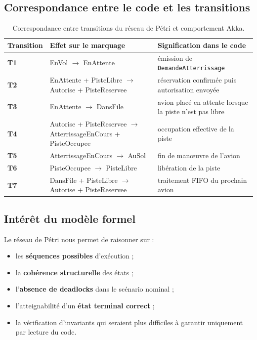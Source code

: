 \documentclass[11pt,a4paper]{article}
\begin{document}
\subsection{Correspondance entre le code et les transitions}

\begin{table}[H]
\centering
\caption{Correspondance entre transitions du réseau de Pétri et comportement Akka.}
\begin{tabularx}{\textwidth}{>{\bfseries}p{2.2cm} p{4.2cm} Y}
\toprule
Transition & Effet sur le marquage & Signification dans le code \\
\midrule
T1 & EnVol $\rightarrow$ EnAttente & émission de \texttt{DemandeAtterrissage} \\
T2 & EnAttente + PisteLibre $\rightarrow$ Autorise + PisteReservee & réservation confirmée puis autorisation envoyée \\
T3 & EnAttente $\rightarrow$ DansFile & avion placé en attente lorsque la piste n'est pas libre \\
T4 & Autorise + PisteReservee $\rightarrow$ AtterrissageEnCours + PisteOccupee & occupation effective de la piste \\
T5 & AtterrissageEnCours $\rightarrow$ AuSol & fin de manœuvre de l'avion \\
T6 & PisteOccupee $\rightarrow$ PisteLibre & libération de la piste \\
T7 & DansFile + PisteLibre $\rightarrow$ Autorise + PisteReservee & traitement FIFO du prochain avion \\
\bottomrule
\end{tabularx}
\end{table}

\subsection{Intérêt du modèle formel}

Le réseau de Pétri nous permet de raisonner sur :
\begin{itemize}
    \item les \textbf{séquences possibles} d'exécution ;
    \item la \textbf{cohérence structurelle} des états ;
    \item l'\textbf{absence de deadlocks} dans le scénario nominal ;
    \item l'atteignabilité d'un \textbf{état terminal correct} ;
    \item la vérification d'invariants qui seraient plus difficiles à garantir uniquement par lecture du code.
\end{itemize}
\end{document}
